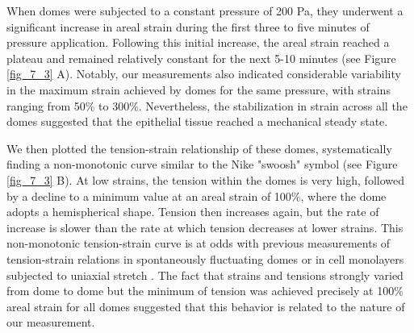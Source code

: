 When domes were subjected to a constant pressure of 200 \unit{\pascal}, they underwent a significant increase in areal strain during the first three to five minutes of pressure application. Following this initial increase, the areal strain reached a plateau and remained relatively constant for the next 5-10 minutes (see Figure \ref{fig_7_3} A). Notably, our measurements also indicated considerable variability in the maximum strain achieved by domes for the same pressure, with strains ranging from 50\% to 300\%. Nevertheless, the stabilization in strain across all the domes suggested that the epithelial tissue reached a mechanical steady state.

We then plotted the tension-strain relationship of these domes, systematically finding a non-monotonic curve similar to the Nike "swoosh" symbol (see Figure \ref{fig_7_3} B). At low strains, the tension within the domes is very high, followed by a decline to a minimum value at an areal strain of 100\%, where the dome adopts a hemispherical shape. Tension then increases  again, but the rate of increase is slower than the rate at which tension decreases at lower strains. This non-monotonic tension-strain curve is at odds with previous measurements of tension-strain relations in spontaneously fluctuating domes \cite{latorre2018,marin-llaurado2022} or in cell monolayers subjected to uniaxial stretch \cite{duque2023}. The fact that strains and tensions strongly varied from dome to dome but the minimum of tension was achieved precisely at 100\% areal strain for all domes suggested that this behavior is related to the nature of our measurement. 



